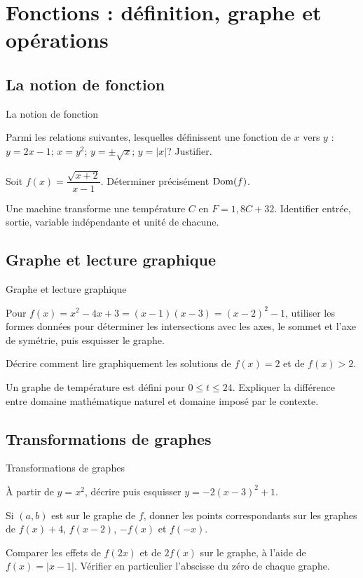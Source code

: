 \chapter{Fonctions : définition, graphe et opérations}
\label{workbook:chapter:03}
\section{La notion de fonction}
\label{workbook:section:03.01}
\begin{exerciseblock}{La notion de fonction}
\item Parmi les relations suivantes, lesquelles définissent une fonction de $x$ vers $y$ : $y=2x-1$; $x=y^2$; $y=\pm\sqrt{x}$; $y=|x|$? Justifier.
\item Soit $f(x)=\dfrac{\sqrt{x+2}}{x-1}$. Déterminer précisément $\operatorname{Dom}(f)$.
\item Une machine transforme une température $C$ en $F=1{,}8C+32$. Identifier entrée, sortie, variable indépendante et unité de chacune.
\end{exerciseblock}
\section{Graphe et lecture graphique}
\label{workbook:section:03.02}
\begin{exerciseblock}{Graphe et lecture graphique}
\item Pour \(f(x)=x^2-4x+3=(x-1)(x-3)=(x-2)^2-1\), utiliser les formes données pour déterminer les intersections avec les axes, le sommet et l'axe de symétrie, puis esquisser le graphe.
\item Décrire comment lire graphiquement les solutions de $f(x)=2$ et de $f(x)>2$.
\item Un graphe de température est défini pour $0\le t\le24$. Expliquer la différence entre domaine mathématique naturel et domaine imposé par le contexte.
\end{exerciseblock}
\section{Transformations de graphes}
\label{workbook:section:03.03}
\begin{exerciseblock}{Transformations de graphes}
\item À partir de $y=x^2$, décrire puis esquisser $y=-2(x-3)^2+1$.
\item Si $(a,b)$ est sur le graphe de $f$, donner les points correspondants sur les graphes de $f(x)+4$, $f(x-2)$, $-f(x)$ et $f(-x)$.
\item Comparer les effets de $f(2x)$ et de $2f(x)$ sur le graphe, à l'aide de \(f(x)=|x-1|\). Vérifier en particulier l'abscisse du zéro de chaque graphe.
\end{exerciseblock}
